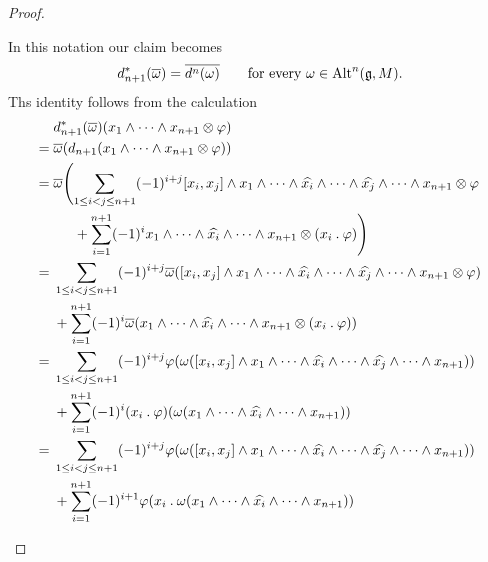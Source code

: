\begin{proof}
\begin{enumerate}
			In this notation our claim becomes
			\begin{equation}
				\label{embedding of cochain complex into dual of chain complex}
				d_{n+1}^*( \overline{\omega} )
				=
				\overline{ d^n(\omega) }
				\qquad
				\text{for every~$\omega \in \operatorname{Alt}^n(\mathfrak{g}, M)$.}
			\end{equation}
			Ths identity follows from the calculation
			\begingroup
			\allowdisplaybreaks
			\begin{align*}
				{}&
				d_{n+1}^*( \overline{\omega} )(x_1 \wedge \dotsb \wedge x_{n+1} \tensor \varphi)
				\\
				={}&
				\overline{\omega}( d_{n+1}( x_1 \wedge \dotsb \wedge x_{n+1} \tensor \varphi ) )
				\\
				={}&
				\overline{\omega}
				\Biggl(
					\sum_{1 \leq i < j \leq n+1}
					(-1)^{i+j}
					[x_i, x_j] \wedge x_1 \wedge \dotsb \wedge \widehat{x_i} \wedge \dotsb \wedge \widehat{x_j} \wedge \dotsb \wedge x_{n+1} \tensor \varphi
				\\
				{}&
				\phantom{
					\omega
					\Biggl(
				}
					+
					\sum_{i=1}^{n+1}
					(-1)^i
					x_1 \wedge \dotsb \wedge \widehat{x_i} \wedge \dotsb \wedge x_{n+1} \tensor (x_i \act \varphi)
				\Biggr)
				\\
				={}&
				\sum_{1 \leq i < j \leq n+1}
				(-1)^{i+j}
				\overline{\omega}
				(
					[x_i, x_j] \wedge x_1 \wedge \dotsb \wedge \widehat{x_i} \wedge \dotsb \wedge \widehat{x_j} \wedge \dotsb \wedge x_{n+1} \tensor \varphi
				)
				\\
				{}&
				+
				\sum_{i=1}^{n+1}
				(-1)^i
				\overline{\omega}
				(
					x_1 \wedge \dotsb \wedge \widehat{x_i} \wedge \dotsb \wedge x_{n+1} \tensor (x_i \act \varphi)
				)
				\\
				={}&
				\sum_{1 \leq i < j \leq n+1}
				(-1)^{i+j}
				\varphi( \omega( [x_i, x_j] \wedge x_1 \wedge \dotsb \wedge \widehat{x_i} \wedge \dotsb \wedge \widehat{x_j} \wedge \dotsb \wedge x_{n+1} ) )
				\\
				{}&
				+
				\sum_{i=1}^{n+1}
				(-1)^i
				(x_i \act \varphi)( \omega( x_1 \wedge \dotsb \wedge \widehat{x_i} \wedge \dotsb \wedge x_{n+1} ) )
				\\
				={}&
				\sum_{1 \leq i < j \leq n+1}
				(-1)^{i+j}
				\varphi( \omega( [x_i, x_j] \wedge x_1 \wedge \dotsb \wedge \widehat{x_i} \wedge \dotsb \wedge \widehat{x_j} \wedge \dotsb \wedge x_{n+1} ) )
				\\
				{}&
				+
				\sum_{i=1}^{n+1}
				(-1)^{i+1}
				\varphi( x_i \act \omega( x_1 \wedge \dotsb \wedge \widehat{x_i} \wedge \dotsb \wedge x_{n+1} ) )

\end{align*}
\end{enumerate}
\end{proof}
